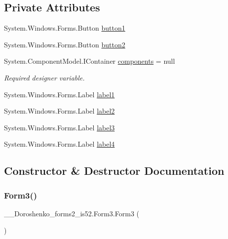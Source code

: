 \subsection*{Private Attributes}
\begin{DoxyCompactItemize}
\item 
System.\+Windows.\+Forms.\+Button \hyperlink{class__7___doroshenko__forms2__is52_1_1_form3_a9be226029548bc97f54780024e84807e}{button1}
\item 
System.\+Windows.\+Forms.\+Button \hyperlink{class__7___doroshenko__forms2__is52_1_1_form3_a5851399903c9a9d44cb388dde361a6e4}{button2}
\item 
System.\+Component\+Model.\+I\+Container \hyperlink{class__7___doroshenko__forms2__is52_1_1_form3_a1917fd652f94155fb7072082f7debd1f}{components} = null
\begin{DoxyCompactList}\small\item\em Required designer variable. \end{DoxyCompactList}\item 
System.\+Windows.\+Forms.\+Label \hyperlink{class__7___doroshenko__forms2__is52_1_1_form3_aefccf808eeaef9a4530d23034bf1431c}{label1}
\item 
System.\+Windows.\+Forms.\+Label \hyperlink{class__7___doroshenko__forms2__is52_1_1_form3_ae0f66866fc9817ba3a1b102617a85a11}{label2}
\item 
System.\+Windows.\+Forms.\+Label \hyperlink{class__7___doroshenko__forms2__is52_1_1_form3_a6312bbe89631ec1227f06cd5803882e4}{label3}
\item 
System.\+Windows.\+Forms.\+Label \hyperlink{class__7___doroshenko__forms2__is52_1_1_form3_a4276c68d6f89b7d637dc61884ec3c38c}{label4}
\end{DoxyCompactItemize}


\subsection{Constructor \& Destructor Documentation}
\hypertarget{class__7___doroshenko__forms2__is52_1_1_form3_a21f3d82d83cd30ee58daa82b090e93d5}{}\label{class__7___doroshenko__forms2__is52_1_1_form3_a21f3d82d83cd30ee58daa82b090e93d5} 
\subsubsection{\texorpdfstring{Form3()}{Form3()}}
{\footnotesize\ttfamily \+\_\+\_\+\+Doroshenko\+\_\+forms2\+\_\+is52.\+Form3.\+Form3 (\begin{DoxyParamCaption}{ }\end{DoxyParamCaption})}


